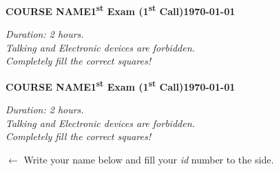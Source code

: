 \documentclass[a4paper]{article}
\newcommand{\ExamTitle}{\textbf{COURSE NAME\hfill 1\textsuperscript{st} Exam (1\textsuperscript{st} Call)}}
\newcommand{\ExamDate}{\today}
\begin{document}


\begin{examcopy}[5]
	\noindent\ExamTitle\hfill\textbf{\ExamDate}
	\begin{center}
		\emph{Duration: 2 hours.}\\
		\emph{Talking and Electronic devices are forbidden.}\\
		\emph{Completely fill the correct squares!}
	\end{center}
	\vspace*{0.5cm}
	\AMCcleardoublepage%
	\AMCformBegin%
	\noindent\ExamTitle\hfill\textbf{\ExamDate}
	\begin{center}
		\emph{Duration: 2 hours.}\\
		\emph{Talking and Electronic devices are forbidden.}\\
		\emph{Completely fill the correct squares!}
	\end{center}
	{\setlength{\parindent}{0pt}\hspace*{\fill}\hspace*{\fill}
	\begin{minipage}[b]{6.5cm}
		\(\longleftarrow{}\)\hspace{1cm} Write your name below and fill your \emph{id} number to the side.

		\vspace{3ex}

		\hfill{}\hfill\vspace{5ex}\end{minipage}\hspace*{\fill}
	}
	\AMCform%
	\AMCcleardoublepage%
\end{examcopy}
\end{document}
